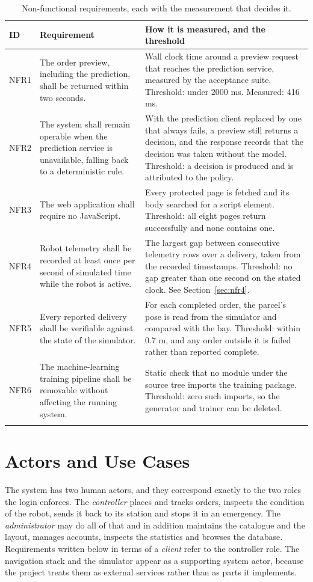 \documentclass[12pt,a4paper]{report}
\begin{document}
\begin{longtable}{@{}p{}p{}p{}@{}}
\toprule
\textbf{ID} & \textbf{Requirement} & \textbf{How it is measured, and the threshold} \\
\midrule
\endhead
NFR1 & The order preview, including the prediction, shall be returned within two seconds. & Wall
clock time around a preview request that reaches the prediction service, measured by the acceptance
suite. Threshold: under 2000 ms. Measured: 416 ms. \\
NFR2 & The system shall remain operable when the prediction service is unavailable, falling back to
a deterministic rule. & With the prediction client replaced by one that always fails, a preview
still returns a decision, and the response records that the decision was taken without the model.
Threshold: a decision is produced and is attributed to the policy. \\
NFR3 & The web application shall require no JavaScript. & Every protected page is fetched and its
body searched for a script element. Threshold: all eight pages return successfully and none
contains one. \\
NFR4 & Robot telemetry shall be recorded at least once per second of simulated time while the robot
is active. & The largest gap between consecutive telemetry rows over a delivery, taken from the
recorded timestamps. Threshold: no gap greater than one second on the stated clock. See
Section~\ref{sec:nfr4}. \\
NFR5 & Every reported delivery shall be verifiable against the state of the simulator. & For each
completed order, the parcel's pose is read from the simulator and compared with the bay. Threshold:
within 0.7 m, and any order outside it is failed rather than reported complete. \\
NFR6 & The machine-learning training pipeline shall be removable without affecting the running
system. & Static check that no module under the source tree imports the training package.
Threshold: zero such imports, so the generator and trainer can be deleted. \\
\bottomrule
\caption{Non-functional requirements, each with the measurement that decides it.}
\label{tab:nfr}
\end{longtable}

\section{Actors and Use Cases}
The system has two human actors, and they correspond exactly to the two roles the login enforces.
The \emph{controller} places and tracks orders, inspects the condition of the robot, sends it back to
its station and stops it in an emergency. The \emph{administrator} may do all of that and in addition
maintains the catalogue and the layout, manages accounts, inspects the statistics and browses the
database. Requirements written below in terms of a \emph{client} refer to the controller role. The navigation stack and the simulator appear as a supporting system actor,
because the project treats them as external services rather than as parts it implements.
\end{document}
